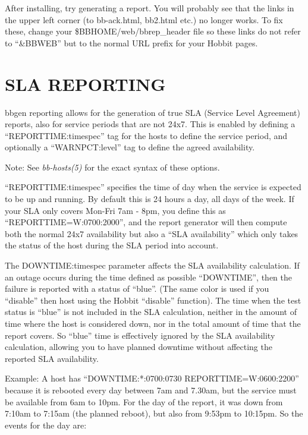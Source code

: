  After installing, try generating a report. You will probably see
  that the links in the upper left corner (to bb-ack.html, bb2.html
  etc.) no longer works. To fix these, change your
  \$BBHOME/web/bbrep\_header file so these links do not refer to
  ``\&BBWEB'' but to the normal URL prefix for your Hobbit pages. 



 
\section{SLA REPORTING}
 bbgen reporting allows for the generation of true SLA (Service Level
 Agreement) reports, also for service periods that are not 24x7. This
 is enabled by defining a ``REPORTTIME:timespec'' tag for the hosts to
 define the service period, and optionally a ``WARNPCT:level'' tag to
 define the agreed availability. 


  Note: See \emph{bb-hosts(5)}
 for the exact syntax of these options. 


  ``REPORTTIME:timespec'' specifies the time of day when the service
  is expected to be up and running. By default this is 24 hours a day,
  all days of the week. If your SLA only covers Mon-Fri 7am - 8pm, you
  define this as ``REPORTTIME=W:0700:2000'', and the report generator
  will then compute both the normal 24x7 availability but also a ``SLA
  availability'' which only takes the status of the host during the
  SLA period into account. 



  The DOWNTIME:timespec parameter affects the SLA availability
  calculation. If an outage occurs during the time defined as possible
  ``DOWNTIME'', then the failure is reported with a status of
  ``blue''. (The same color is used if you ``disable'' then host using
  the Hobbit ``disable'' function). The time when the test status is
  ``blue'' is not included in the SLA calculation, neither in the
  amount of time where the host is considered down, nor in the total
  amount of time that the report covers. So ``blue'' time is
  effectively ignored by the SLA availability calculation, allowing
  you to have planned downtime without affecting the reported SLA
  availability. 



  Example: A host has ``DOWNTIME:*:0700:0730 REPORTTIME=W:0600:2200''
  because it is rebooted every day between 7am and 7.30am, but the
  service must be available from 6am to 10pm. For the day of the
  report, it was down from 7:10am to 7:15am (the planned reboot), but
  also from 9:53pm to 10:15pm. So the events for the day are: 



